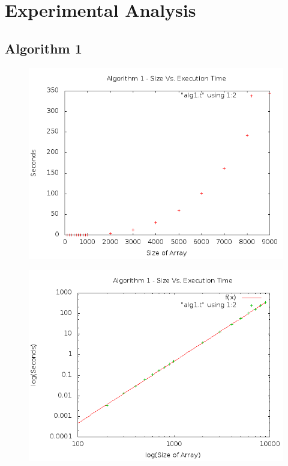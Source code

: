 \documentclass[a4paper,10pt]{article}
\begin{document}
	\section{Experimental Analysis}
		\subsection{Algorithm 1}
		
			\begin{figure}[!htb]
				\centering
				\includegraphics[scale=.5]{timingfiles/alg1plot.png}
			\end{figure}
			\begin{figure}[!htb]
				\centering
				\includegraphics[scale=.5]{timingfiles/alg1plotlog.png}
			\end{figure}
		\newpage
\end{document}

